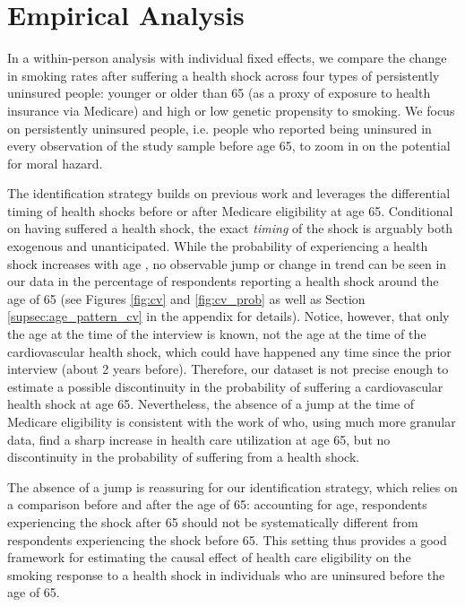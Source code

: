 \documentclass[11pt]{article}
\begin{document}
\section{Empirical Analysis}\label{sec:analysis}

\noindent
In a within-person analysis with individual fixed effects, we compare the change in smoking rates after suffering a health shock across four types of persistently uninsured people: younger or older than 65 (as a proxy of exposure to health insurance via Medicare) and high or low genetic propensity to smoking.
We focus on persistently uninsured people, i.e. people who reported being uninsured in every observation of the study sample before age 65, to zoom in on the potential for moral hazard.

The identification strategy builds on previous work \citep{Marti2017} and leverages the differential timing of health shocks before or after Medicare eligibility at age 65.
Conditional on having suffered a health shock, the exact \textit{timing} of the shock is arguably both exogenous and unanticipated.
While the probability of experiencing a health shock increases with age \citep{Lloyd-Jones2010}, no observable jump or change in trend can be seen in our data in the percentage of respondents reporting a health shock around the age of 65 (see Figures \ref{fig:cv} and \ref{fig:cv_prob} as well as Section \ref{supsec:age_pattern_cv} in the appendix for details).
Notice, however, that only the age at the time of the interview is known, not the age at the time of the cardiovascular health shock, which could have happened any time since the prior interview (about 2 years before).
Therefore, our dataset is not precise enough to estimate a possible discontinuity in the probability of suffering a cardiovascular health shock at age 65.
Nevertheless, the absence of a jump at the time of Medicare eligibility is consistent with the work of \cite{Card2008,Card2009medicare} who, using much more granular data, find a sharp increase in health care utilization at age 65, but no discontinuity in the probability of suffering from a health shock.

The absence of a jump is reassuring for our identification strategy, which relies on a comparison before and after the age of 65: accounting for age, respondents experiencing the shock after 65 should not be systematically different from respondents experiencing the shock before 65.
This setting thus provides a good framework for estimating the causal effect of health care eligibility on the smoking response to a health shock in individuals who are uninsured before the age of 65.
\end{document}
